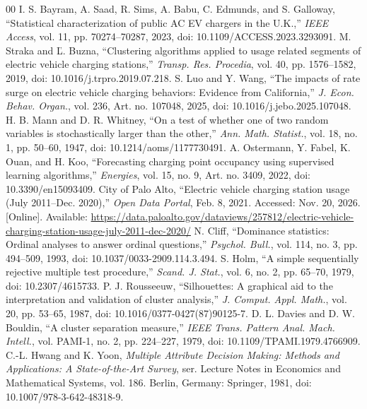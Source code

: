 \documentclass[conference,a4paper]{IEEEtran}
\begin{document}
\renewcommand{\refname}{Tài liệu tham khảo}
\begin{thebibliography}{00}
I. S. Bayram, A. Saad, R. Sims, A. Babu, C. Edmunds, and S. Galloway,
“Statistical characterization of public AC EV chargers in the U.K.,”
\textit{IEEE Access}, vol. 11, pp. 70274--70287, 2023, doi: 10.1109/ACCESS.2023.3293091.
M. Straka and Ľ. Buzna, “Clustering algorithms applied to usage related segments of electric vehicle charging stations,”
\textit{Transp. Res. Procedia}, vol. 40, pp. 1576--1582, 2019, doi: 10.1016/j.trpro.2019.07.218.
S. Luo and Y. Wang, “The impacts of rate surge on electric vehicle charging behaviors: Evidence from California,”
\textit{J. Econ. Behav. Organ.}, vol. 236, Art. no. 107048, 2025, doi: 10.1016/j.jebo.2025.107048.
H. B. Mann and D. R. Whitney, “On a test of whether one of two random variables is stochastically larger than the other,”
\textit{Ann. Math. Statist.}, vol. 18, no. 1, pp. 50--60, 1947, doi: 10.1214/aoms/1177730491.
A. Ostermann, Y. Fabel, K. Ouan, and H. Koo, “Forecasting charging point occupancy using supervised learning algorithms,”
\textit{Energies}, vol. 15, no. 9, Art. no. 3409, 2022, doi: 10.3390/en15093409.
City of Palo Alto, “Electric vehicle charging station usage (July 2011--Dec. 2020),”
\textit{Open Data Portal}, Feb. 8, 2021. Accessed: Nov. 20, 2026. [Online]. Available:
\url{https://data.paloalto.gov/dataviews/257812/electric-vehicle-charging-station-usage-july-2011-dec-2020/}
N. Cliff, “Dominance statistics: Ordinal analyses to answer ordinal questions,”
\textit{Psychol. Bull.}, vol. 114, no. 3, pp. 494--509, 1993, doi: 10.1037/0033-2909.114.3.494.
S. Holm, “A simple sequentially rejective multiple test procedure,”
\textit{Scand. J. Stat.}, vol. 6, no. 2, pp. 65--70, 1979, doi: 10.2307/4615733.
P. J. Rousseeuw, “Silhouettes: A graphical aid to the interpretation and validation of cluster analysis,”
\textit{J. Comput. Appl. Math.}, vol. 20, pp. 53--65, 1987, doi: 10.1016/0377-0427(87)90125-7.
D. L. Davies and D. W. Bouldin, “A cluster separation measure,”
\textit{IEEE Trans. Pattern Anal. Mach. Intell.}, vol. PAMI-1, no. 2, pp. 224--227, 1979,
doi: 10.1109/TPAMI.1979.4766909.
C.-L. Hwang and K. Yoon, \textit{Multiple Attribute Decision Making: Methods and Applications: A State-of-the-Art Survey},
ser. Lecture Notes in Economics and Mathematical Systems, vol. 186. Berlin, Germany: Springer, 1981, doi: 10.1007/978-3-642-48318-9.

\end{thebibliography}
\end{document}
